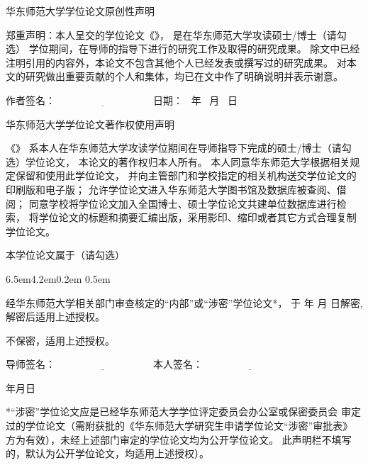 \thispagestyle{empty}

\vspace*{1em}

{
\linespread{1.4}
\centerline{\STSong 华东师范大学学位论文原创性声明}

\bigskip

郑重声明：本人呈交的学位论文《\cctitle》，
是在华东师范大学攻读硕士/博士（请勾选）
学位期间，在导师的指导下进行的研究工作及取得的研究成果。
除文中已经注明引用的内容外，本论文不包含其他个人已经发表或撰写过的研究成果。
对本文的研究做出重要贡献的个人和集体，均已在文中作了明确说明并表示谢意。

\vspace{1em}


{\STSong 作者签名}：$\underline{\hspace{4cm}}$ \hfill
{\STSong 日\quad 期}： \qquad\ 年 \quad\ 月 \quad\ 日 \qquad\mbox{}

\vspace{4em}

\centerline{\STSong 华东师范大学学位论文著作权使用声明}
\bigskip


《\cctitle》
系本人在华东师范大学攻读学位期间在导师指导下完成的硕士/博士（请勾选）学位论文，
本论文的著作权归本人所有。
本人同意华东师范大学根据相关规定保留和使用此学位论文，
并向主管部门和学校指定的相关机构送交学位论文的印刷版和电子版；
允许学位论文进入华东师范大学图书馆及数据库被查阅、借阅；
同意学校将学位论文加入全国博士、硕士学位论文共建单位数据库进行检索，
将学位论文的标题和摘要汇编出版，采用影印、缩印或者其它方式合理复制学位论文。

本学位论文属于（请勾选）
\begin{list}{{\hfill\upshape (\qquad)\ . }}{%
     \leftmargin6.5em4.2em0.2em
     \itemsep0.5em}

\item 经华东师范大学相关部门审查核定的“内部”或“涉密”学位论文*，
  于 \qquad 年 \quad 月 \quad  日解密, 解密后适用上述授权。

\item 不保密，适用上述授权。
\end{list}

\vskip0.8cm


{\STSong 导师签名}：$\underline{\hspace{4cm}}$ \hfill
{\STSong 本人签名}：$\underline{\hspace{4cm}}$

\bigskip

{\mbox{}\hfill 年\qquad 月\qquad  日 }

\vfill

\parbox[t]{0.946\textwidth}{
*“涉密”学位论文应是已经华东师范大学学位评定委员会办公室或保密委员会
审定过的学位论文（需附获批的《华东师范大学研究生申请学位论文“涉密”审批表》
方为有效），未经上述部门审定的学位论文均为公开学位论文。
此声明栏不填写的，默认为公开学位论文，均适用上述授权）。\\
}}
